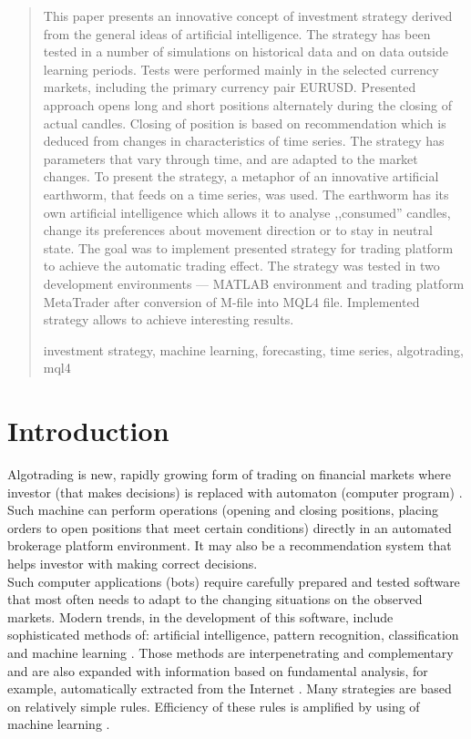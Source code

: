 \documentclass[runningheads,a4paper]{llncs}
\newcommand{\keywords}[1]{\par\addvspace\baselineskip
\noindent\keywordname\enspace\ignorespaces#1}
\begin{document}
\begin{abstract}
This paper presents an innovative concept of investment strategy derived from the general ideas of artificial intelligence. The strategy has been tested in a number of simulations on historical data and on data outside learning periods. Tests were performed mainly in the selected currency markets, including the primary currency pair EURUSD. Presented approach opens long and short positions alternately during the closing of actual candles. Closing of position is based on recommendation which is deduced from changes in characteristics of time series. The strategy has parameters that vary through time, and are adapted to the market changes. To present the strategy, a metaphor of an innovative artificial earthworm, that feeds on a time series, was used. The earthworm has its own artificial intelligence which allows it to analyse ,,consumed'' candles, change its preferences about movement direction or to stay in neutral state. The goal was to implement presented strategy for trading platform to achieve the automatic trading effect.  The strategy was tested in two development environments --- MATLAB environment and trading platform MetaTrader after conversion of M-file into MQL4 file. Implemented strategy allows to achieve interesting results.
\keywords{investment strategy, machine learning, forecasting, time series, algotrading, mql4}
\end{abstract}


\section{Introduction}

Algotrading is new, rapidly growing form of trading on financial markets where investor (that makes decisions) is replaced with automaton (computer program) \cite{Leshik2011,Wilinski2014}. Such machine can perform operations (opening and closing positions, placing orders to open positions that meet certain conditions) directly in an automated brokerage platform environment. It may also be a recommendation system that helps investor with making correct decisions.\\

Such computer applications (bots) require carefully prepared and tested software that most often needs to adapt to the changing situations on the observed markets. Modern trends, in the development of this software, include sophisticated methods of: artificial intelligence, pattern recognition, classification and machine learning \cite{Leshik2011,Wilinski,wang,sinclare}. Those methods are interpenetrating and complementary and are also expanded with information based on fundamental analysis, for example, automatically extracted from the Internet \cite{elder,Wilinski2014,Schwager1996}. Many strategies are based on relatively simple rules. Efficiency of these rules is amplified by using of machine learning \cite{Wilinski,person,tian,krutsinger,lewis,murphy}.\\
\end{document}
